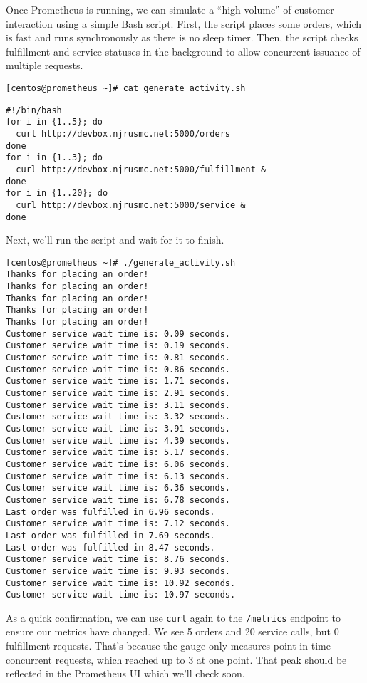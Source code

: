 Once Prometheus is running, we can simulate a ``high volume'' of customer
interaction using a simple Bash script. First, the script places some orders,
which is fast and runs synchronously as there is no sleep timer. Then,
the script checks fulfillment and service statuses in the background to
allow concurrent issuance of multiple requests.

\begin{verbatim}
[centos@prometheus ~]# cat generate_activity.sh
\end{verbatim}

\begin{verbatim}
#!/bin/bash
for i in {1..5}; do
  curl http://devbox.njrusmc.net:5000/orders
done
for i in {1..3}; do
  curl http://devbox.njrusmc.net:5000/fulfillment &
done
for i in {1..20}; do
  curl http://devbox.njrusmc.net:5000/service &
done
\end{verbatim}

Next, we'll run the script and wait for it to finish.

\begin{verbatim}
[centos@prometheus ~]# ./generate_activity.sh 
Thanks for placing an order!
Thanks for placing an order!
Thanks for placing an order!
Thanks for placing an order!
Thanks for placing an order!
Customer service wait time is: 0.09 seconds.
Customer service wait time is: 0.19 seconds.
Customer service wait time is: 0.81 seconds.
Customer service wait time is: 0.86 seconds.
Customer service wait time is: 1.71 seconds.
Customer service wait time is: 2.91 seconds.
Customer service wait time is: 3.11 seconds.
Customer service wait time is: 3.32 seconds.
Customer service wait time is: 3.91 seconds.
Customer service wait time is: 4.39 seconds.
Customer service wait time is: 5.17 seconds.
Customer service wait time is: 6.06 seconds.
Customer service wait time is: 6.13 seconds.
Customer service wait time is: 6.36 seconds.
Customer service wait time is: 6.78 seconds.
Last order was fulfilled in 6.96 seconds.
Customer service wait time is: 7.12 seconds.
Last order was fulfilled in 7.69 seconds.
Last order was fulfilled in 8.47 seconds.
Customer service wait time is: 8.76 seconds.
Customer service wait time is: 9.93 seconds.
Customer service wait time is: 10.92 seconds.
Customer service wait time is: 10.97 seconds.
\end{verbatim}

As a quick confirmation, we can use \verb|curl| again to the \verb|/metrics|
endpoint to ensure our metrics have changed. We see 5 orders and 20 service
calls, but 0 fulfillment requests. That's because the gauge only measures
point-in-time concurrent requests, which reached up to 3 at one point. That
peak should be reflected in the Prometheus UI which we'll check soon.

